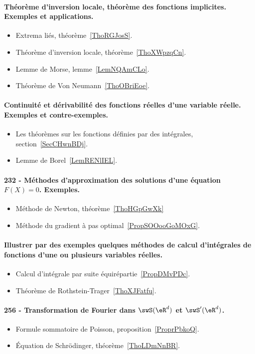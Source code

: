\paragraph{Théorème d’inversion locale, théorème des fonctions implicites. Exemples et applications.}
\begin{itemize}
    \item Extrema liés, théorème~\ref{ThoRGJosS}.
    \item Théorème d'inversion locale, théorème~\ref{ThoXWpzqCn}.
    \item Lemme de Morse, lemme~\ref{LemNQAmCLo}.
    \item Théorème de Von Neumann~\ref{ThoOBriEoe}.
\end{itemize}
\paragraph{Continuité et dérivabilité des fonctions réelles d'une variable réelle. Exemples et contre-exemples.}
\begin{itemize}
    \item Les théorèmes sur les fonctions définies par des intégrales, section~\ref{SecCHwnBDj}.
    \item Lemme de Borel~\ref{LemRENlIEL}.
\end{itemize}
\paragraph{232 - Méthodes d'approximation des solutions d’une équation $F(X)=0$. Exemples.}
\begin{itemize}
    \item Méthode de Newton, théorème~\ref{ThoHGpGwXk}
    \item Méthode du gradient à pas optimal~\ref{PropSOOooGoMOxG}.
\end{itemize}
\paragraph{Illustrer par des exemples quelques méthodes de calcul d'intégrales de fonctions d’une ou plusieurs variables réelles.}
\begin{itemize}
    \item Calcul d'intégrale par suite équirépartie~\ref{PropDMvPDc}.
    \item Théorème de Rothstein-Trager~\ref{ThoXJFatfu}.
\end{itemize}
\paragraph{256 - Transformation de Fourier dans \( \swS(\eR^d)\) et \( \swS'(\eR^d)\).}
\begin{itemize}
    \item Formule sommatoire de Poisson, proposition~\ref{ProprPbkoQ}.
    \item Équation de Schrödinger, théorème~\ref{ThoLDmNnBR}.
\end{itemize}
